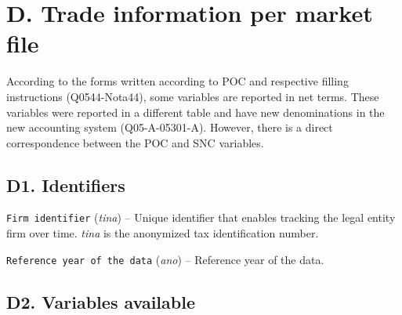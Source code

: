 \documentclass[]{book}
\begin{document}
\hypertarget{d.-trade-information-per-market-file}{%
\section{D. Trade information per market file}\label{d.-trade-information-per-market-file}}

According to the forms written according to POC and respective filling instructions (Q0544-Nota44), some variables are reported in net terms. These variables were reported in a different table and have new denominations in the new accounting system (Q05-A-05301-A). However, there is a direct correspondence between the POC and SNC variables.

\hypertarget{d1.-identifiers}{%
\subsection{D1. Identifiers}\label{d1.-identifiers}}

\texttt{Firm\ identifier} (\emph{tina}) -- Unique identifier that enables tracking the legal entity firm over time. \emph{tina} is the anonymized tax identification number.

\texttt{Reference\ year\ of\ the\ data} (\emph{ano}) -- Reference year of the data.

\hypertarget{d2.-variables-available}{%
\subsection{D2. Variables available}\label{d2.-variables-available}}
\end{document}
